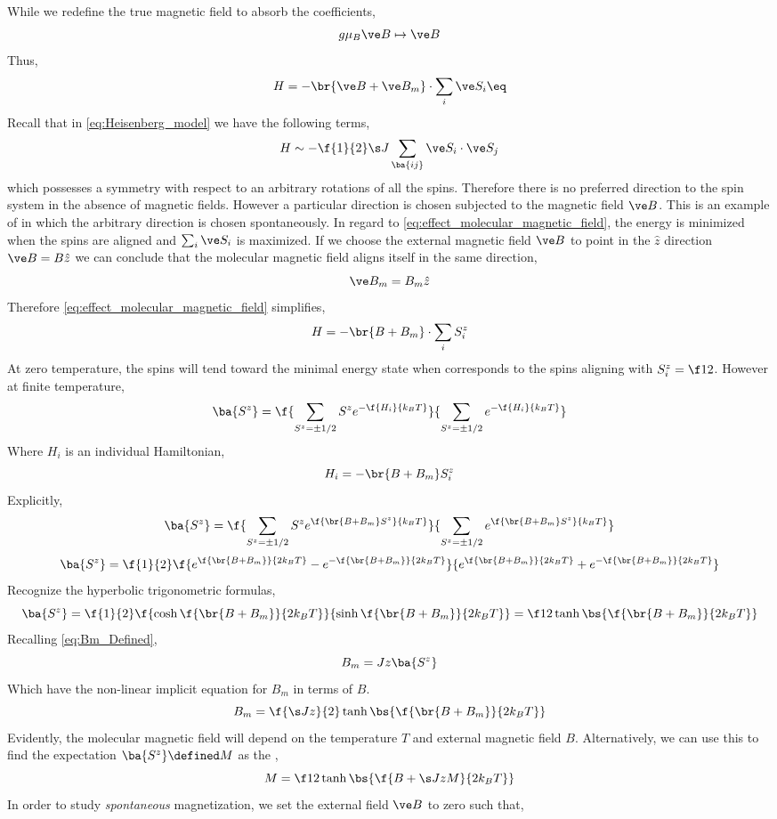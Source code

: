 \documentclass{article}
\begin{document}
While we redefine the true magnetic field to absorb the coefficients,
\[ g \mu_B \ve B \mapsto \ve B \]
Thus,
\[ H = -\br{\ve B + \ve B_m} \cdot \sum_{i} \ve S_i \eq \label{eq:effect_molecular_magnetic_field} \]
Recall that in \cref{eq:Heisenberg_model} we have the following terms,
\[ H \sim - \f{1}{2}\s J \sum_{\ba{ij}} \ve S_i \cdot \ve S_j \]
which possesses a symmetry with respect to an arbitrary rotations of all the spins. Therefore there is no preferred direction to the spin system in the absence of magnetic fields. However a particular direction is chosen subjected to the magnetic field $\ve B$. This is an example of  in which the arbitrary direction is chosen spontaneously. In regard to \cref{eq:effect_molecular_magnetic_field}, the energy is minimized when the spins are aligned and $\sum_i \ve S_i$ is maximized. If we choose the external magnetic field $\ve B$ to point in the $\hat z$ direction $\ve B = B \hat z$ we can conclude that the molecular magnetic field aligns itself in the same direction,
\[ \ve B_m = B_m \hat z \]
Therefore \cref{eq:effect_molecular_magnetic_field} simplifies,
\[ H = -\br{B + B_m} \cdot \sum_{i} S_i^z \]
At zero temperature, the spins will tend toward the minimal energy state when corresponds to the spins aligning with $S_i^z = \f12$. However at finite temperature,
\[ \ba{S^z} = \f{\sum_{S^{z} = \pm 1/2} S^{z}e^{-\f{H_i}{k_B T}}}{\sum_{S^{z} = \pm 1/2} e^{-\f{H_i}{k_B T}}} \]
Where $H_i$ is an individual Hamiltonian,
\[ H_i = -\br{B + B_m} S_i^{z} \]
Explicitly,
\[ \ba{S^z} = \f{\sum_{S^{z} = \pm 1/2} S^{z}e^{\f{\br{B+B_m}S^{z}}{k_B T}}}{\sum_{S^{z} = \pm 1/2} e^{\f{\br{B+B_m}S^{z}}{k_B T}}} \]
\[ \ba{S^z} = \f{1}{2}\f{e^{\f{\br{B+B_m}}{2k_B T}} - e^{-\f{\br{B+B_m}}{2k_B T}}}{e^{\f{\br{B+B_m}}{2k_B T}} + e^{-\f{\br{B+B_m}}{2k_B T}}} \]
Recognize the hyperbolic trigonometric formulas,
\[ \ba{S^z} = \f{1}{2}\f{\cosh \f{\br{B+B_m}}{2k_B T}}{\sinh \f{\br{B+B_m}}{2k_B T}} = \f12 \tanh \bs{\f{\br{B+B_m}}{2k_B T}} \]
Recalling \cref{eq:Bm_Defined},
\[ B_m = J z \ba{S^{z}} \]
Which have the non-linear implicit equation for $B_m$ in terms of $B$.
\[ B_m = \f{\s J z}{2} \tanh \bs{\f{\br{B+B_m}}{2k_B T}} \]
Evidently, the molecular magnetic field will depend on the temperature $T$ and external magnetic field $B$. Alternatively, we can use this to find the expectation $\ba{S^{z}} \defined M$ as the ,
\[ M = \f12 \tanh \bs{\f{B + \s J z M}{2 k_B T}} \]
In order to study \textit{spontaneous} magnetization, we set the external field $\ve B$ to zero such that,
\end{document}

